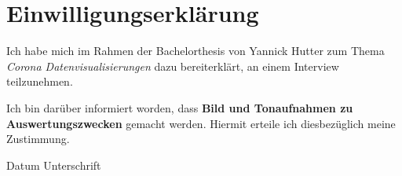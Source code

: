 \documentclass[12pt, oneside]{article}
\begin{document}

\section*{Einwilligungserklärung}
Ich habe mich im Rahmen der Bachelorthesis von Yannick Hutter zum Thema \textit{Corona Datenvisualisierungen} dazu bereiterklärt, an einem Interview teilzunehmen.

Ich bin darüber informiert worden, dass \textbf{Bild und Tonaufnahmen zu Auswertungszwecken} gemacht werden. Hiermit erteile ich diesbezüglich meine Zustimmung.

\vspace{3cm}
Datum \hspace{7cm}Unterschrift

\end{document}

